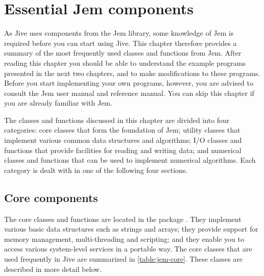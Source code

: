 
\chapter{Essential Jem components}
\label{chapter:essential-jem-components}

As Jive uses components from the Jem library, some knowledge of Jem is
required before you can start using Jive. This chapter therefore provides
a summary of the most frequently used classes and functions from Jem.
After reading this chapter you should be able to understand the example
programs presented in the next two chapters, and to make modifications to
these programs. Before you start implementing your own programs, however,
you are advised to consult the Jem user manual and reference manual. You
can skip this chapter if you are already familiar with Jem.

The classes and functions discussed in this chapter are divided into four
categories: core classes that form the foundation of Jem; utility classes
that implement various common data structures and algorithms; I/O classes
and functions that provide facilities for reading and writing data; and
numerical classes and functions that can be used to implement numerical
algorithms. Each category is dealt with in one of the following four
sections.


\section{Core components}

The core classes and functions are located in the package .
They implement various basic data structures such as strings and arrays;
they provide support for memory management, multi-threading and
scripting; and they enable you to access various system-level services
in a portable way. The core classes that are used frequently in Jive are
summarized in \autoref{table:jem-core}. These classes are described in
more detail below.

